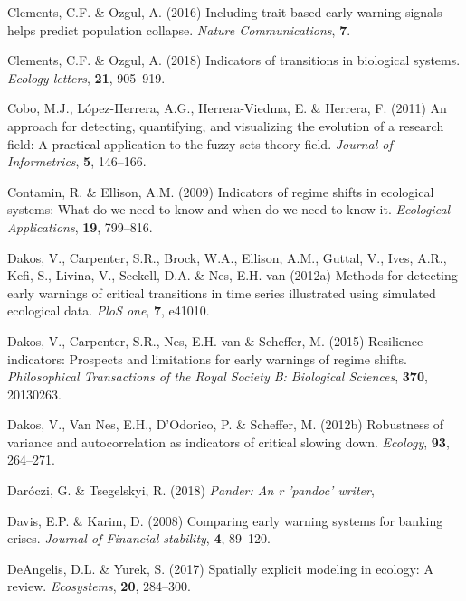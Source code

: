 \documentclass[print]{nuthesis}
\begin{document}
\leavevmode\hypertarget{ref-clements_including_2016}{}%
Clements, C.F. \& Ozgul, A. (2016) Including trait-based early warning signals helps predict population collapse. \emph{Nature Communications}, \textbf{7}.

\leavevmode\hypertarget{ref-clements2018indicators}{}%
Clements, C.F. \& Ozgul, A. (2018) Indicators of transitions in biological systems. \emph{Ecology letters}, \textbf{21}, 905--919.

\leavevmode\hypertarget{ref-cobo2011approach}{}%
Cobo, M.J., López-Herrera, A.G., Herrera-Viedma, E. \& Herrera, F. (2011) An approach for detecting, quantifying, and visualizing the evolution of a research field: A practical application to the fuzzy sets theory field. \emph{Journal of Informetrics}, \textbf{5}, 146--166.

\leavevmode\hypertarget{ref-contamin_indicators_2009}{}%
Contamin, R. \& Ellison, A.M. (2009) Indicators of regime shifts in ecological systems: What do we need to know and when do we need to know it. \emph{Ecological Applications}, \textbf{19}, 799--816.

\leavevmode\hypertarget{ref-dakos2012methods}{}%
Dakos, V., Carpenter, S.R., Brock, W.A., Ellison, A.M., Guttal, V., Ives, A.R., Kefi, S., Livina, V., Seekell, D.A. \& Nes, E.H. van (2012a) Methods for detecting early warnings of critical transitions in time series illustrated using simulated ecological data. \emph{PloS one}, \textbf{7}, e41010.

\leavevmode\hypertarget{ref-dakos2015resilience}{}%
Dakos, V., Carpenter, S.R., Nes, E.H. van \& Scheffer, M. (2015) Resilience indicators: Prospects and limitations for early warnings of regime shifts. \emph{Philosophical Transactions of the Royal Society B: Biological Sciences}, \textbf{370}, 20130263.

\leavevmode\hypertarget{ref-dakos2012robustness}{}%
Dakos, V., Van Nes, E.H., D'Odorico, P. \& Scheffer, M. (2012b) Robustness of variance and autocorrelation as indicators of critical slowing down. \emph{Ecology}, \textbf{93}, 264--271.

\leavevmode\hypertarget{ref-pander}{}%
Daróczi, G. \& Tsegelskyi, R. (2018) \emph{Pander: An r 'pandoc' writer},

\leavevmode\hypertarget{ref-davis_comparing_2008}{}%
Davis, E.P. \& Karim, D. (2008) Comparing early warning systems for banking crises. \emph{Journal of Financial stability}, \textbf{4}, 89--120.

\leavevmode\hypertarget{ref-deangelis2017spatially}{}%
DeAngelis, D.L. \& Yurek, S. (2017) Spatially explicit modeling in ecology: A review. \emph{Ecosystems}, \textbf{20}, 284--300.
\end{document}
